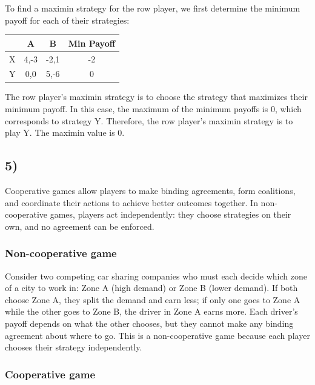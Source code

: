 \documentclass[10pt]{article}
\begin{document}
\vspace{1em}

To find a maximin strategy for the row player, we first determine the minimum payoff for each of their strategies:

\vspace{1em}

\noindent
\begin{tabular}{c|c|c|c}
& A & B & Min Payoff \\
\hline
X & 4,-3 & -2,1 & -2 \\
\hline
Y & 0,0 & 5,-6 & 0 \\
\end{tabular}

\vspace{2em}

The row player's maximin strategy is to choose the strategy that maximizes their minimum payoff. In this case, the maximum of the minimum payoffs is 0, which corresponds to strategy Y. Therefore, the row player's maximin strategy is to play Y. The maximin value is 0.


\subsection*{5)}

Cooperative games allow players to make binding agreements, form coalitions, and coordinate their actions to achieve better outcomes together. In non-cooperative games, players act independently: they choose strategies on their own, and no agreement can be enforced.

\subsubsection*{Non-cooperative game}

Consider two competing car sharing companies who must each decide which zone of a city to work in: Zone A (high demand) or Zone B (lower demand). If both choose Zone A, they split the demand and earn less; if only one goes to Zone A while the other goes to Zone B, the driver in Zone A earns more. Each driver's payoff depends on what the other chooses, but they cannot make any binding agreement about where to go. This is a non-cooperative game because each player chooses their strategy independently.

\subsubsection*{Cooperative game}
\end{document}
